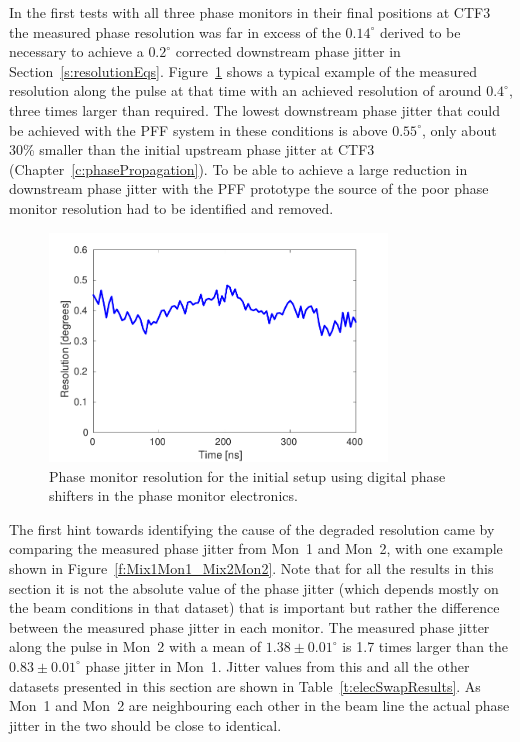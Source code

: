 
In the first tests with all three phase monitors in their final positions at CTF3 the measured phase resolution was far in excess of the \(0.14^\circ\) derived to be necessary to achieve a \(0.2^\circ\) corrected downstream phase jitter in Section~\ref{s:resolutionEqs}. Figure~\ref{f:resolutionDigShift} shows a typical example of the measured resolution along the pulse at that time with an achieved resolution of around \(0.4^\circ\), three times larger than required. The lowest downstream phase jitter that could be achieved with the PFF system in these conditions is above \(0.55^\circ\), only about 30\% smaller than the initial upstream phase jitter at CTF3 (Chapter~\ref{c:phasePropagation}). To be able to achieve a large reduction in downstream phase jitter with the PFF prototype the source of the poor phase monitor resolution had to be identified and removed.

\begin{figure}
  \centering
  \includegraphics[width=0.8\textwidth]{Figures/phaseMons/resolutionDigShift}
  \caption{Phase monitor resolution for the initial setup using digital phase shifters in the phase monitor electronics.}
  \label{f:resolutionDigShift}
\end{figure}

The first hint towards identifying the cause of the degraded resolution came by comparing the measured phase jitter from Mon~1 and Mon~2, with one example shown in Figure~\ref{f:Mix1Mon1_Mix2Mon2}. Note that for all the results in this section it is not the absolute value of the phase jitter (which depends mostly on the beam conditions in that dataset) that is important but rather the difference between the measured phase jitter in each monitor. The measured phase jitter along the pulse in Mon~2 with a mean of \(1.38\pm0.01^\circ\) is 1.7 times larger than the \(0.83\pm0.01^\circ\) phase jitter in Mon~1. Jitter values from this and all the other datasets presented in this section are shown in Table~\ref{t:elecSwapResults}. As Mon~1 and Mon~2 are neighbouring each other in the beam line the actual phase jitter in the two should be close to identical.

